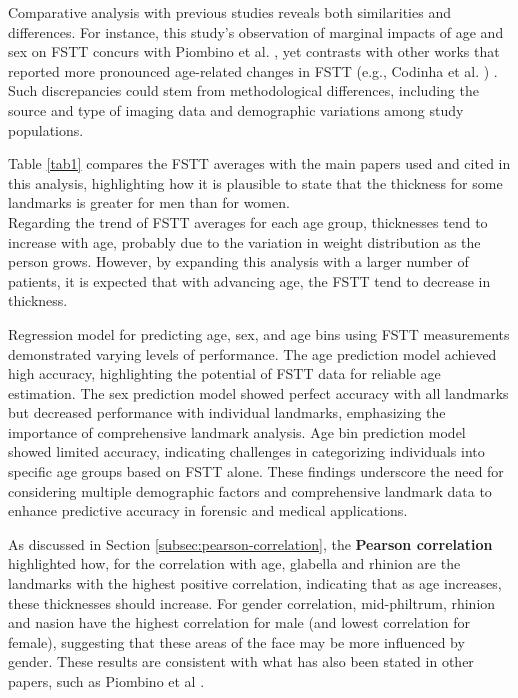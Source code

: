 \documentclass[journal,article,submit,pdftex,moreauthors]{Definitions/mdpi}
\begin{document}
Comparative analysis with previous studies reveals both similarities and differences. For instance, this study's observation of marginal impacts of age and sex on FSTT concurs with Piombino et al. \cite{ref19}, yet contrasts with other works that reported more pronounced age-related changes in FSTT (e.g., Codinha et al. \cite{ref13}) \cite{ref1,ref13}. Such discrepancies could stem from methodological differences, including the source and type of imaging data and demographic variations among study populations.

Table \ref{tab1} compares the FSTT averages with the main papers used and cited in this analysis, highlighting how it is plausible to state that the thickness for some landmarks is greater for men than for women. \\ Regarding the trend of FSTT averages for each age group, thicknesses tend to increase with age, probably due to the variation in weight distribution as the person grows. However, by expanding this analysis with a larger number of patients, it is expected that with advancing age, the FSTT tend to decrease in thickness.

Regression model for predicting age, sex, and age bins using FSTT measurements demonstrated varying levels of performance. The age prediction model achieved high accuracy, highlighting the potential of FSTT data for reliable age estimation. The sex prediction model showed perfect accuracy with all landmarks but decreased performance with individual landmarks, emphasizing the importance of comprehensive landmark analysis. Age bin prediction model showed limited accuracy, indicating challenges in categorizing individuals into specific age groups based on FSTT alone. These findings underscore the need for considering multiple demographic factors and comprehensive landmark data to enhance predictive accuracy in forensic and medical applications. 

As discussed in Section \ref{subsec:pearson-correlation}, the \textbf{Pearson correlation} highlighted how, for the correlation with age, glabella and rhinion are the landmarks with the highest positive correlation, indicating that as age increases, these thicknesses should increase. For gender correlation, mid-philtrum, rhinion and nasion have the highest correlation for male (and lowest correlation for female), suggesting that these areas of the face may be more influenced by gender. These results are consistent with what has also been stated in other papers, such as Piombino et al \cite{ref19}. 
\end{document}
